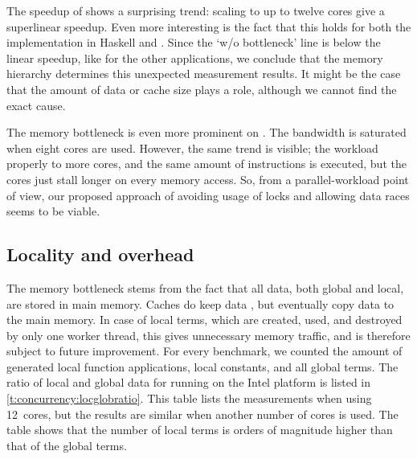 The speedup of  shows a surprising trend: scaling to up to twelve cores give a superlinear speedup.
Even more interesting is the fact that this holds for both the implementation in Haskell and \ourfp.
Since the `w/o bottleneck' line is below the linear speedup, like for the other applications, we conclude that the memory hierarchy determines this unexpected measurement results.
It might be the case that the amount of data or cache size plays a role, although we cannot find the exact cause.

The memory bottleneck is even more prominent on \Starburst.
The bandwidth is saturated when eight cores are used.
However, the same trend is visible; the workload  properly to more cores, and the same amount of instructions is executed, but the cores just stall longer on every memory access.
So, from a parallel-workload point of view, our proposed approach of avoiding usage of locks and allowing data races seems to be viable.

\subsection{Locality and overhead}

The memory bottleneck stems from the fact that all data, both global and local, are stored in main memory.
Caches do keep data , but eventually copy data to the main memory.
In case of local terms, which are created, used, and destroyed by only one worker thread, this gives unnecessary memory traffic, and is therefore subject to future improvement.
For every benchmark, we counted the amount of generated local function applications, local constants, and all global terms.
The ratio of local and global data for \ourfp running on the Intel platform is listed in \vref{t:concurrency:locglobratio}.
This table lists the measurements when using 12~cores, but the results are similar when another number of cores is used.
The table shows that the number of local terms is orders of magnitude higher than that of the global terms.


